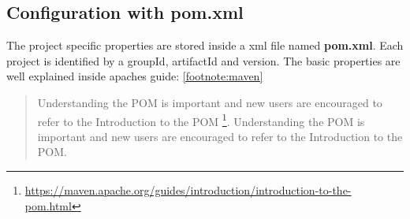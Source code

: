 \subsection{Configuration with pom.xml}
The project specific properties are stored inside a xml file named \textbf{pom.xml}. Each project is identified by a groupId, artifactId and version. The basic properties are well explained inside apaches guide: \ref{footnote:maven}

\begin{quotation}
	Understanding the POM is important and new users are encouraged to refer to the Introduction to the POM \footnote{\url{https://maven.apache.org/guides/introduction/introduction-to-the-pom.html}}. Understanding the POM is important and new users are encouraged to refer to the Introduction to the POM.
	

\end{quotation}
